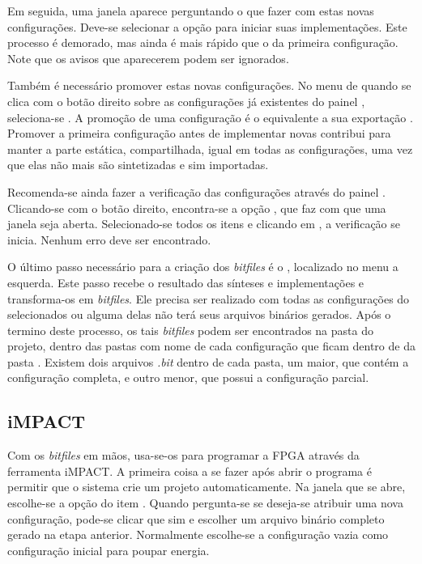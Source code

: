 \documentclass[11pt,a4paper,oneside]{book}
\begin{document}
Em seguida, uma janela aparece perguntando o que fazer com estas novas configurações.
Deve-se selecionar a opção  para iniciar suas implementações.
Este processo é demorado, mas ainda é mais rápido que o da primeira configuração.
Note que os avisos que aparecerem podem ser ignorados.

Também é necessário promover estas novas configurações.
No menu de quando se clica com o botão direito sobre as configurações já existentes do painel , seleciona-se .
A promoção de uma configuração é o equivalente a sua exportação \cite{ug748}.
Promover a primeira configuração antes de implementar novas contribui para manter a parte estática, compartilhada, igual em todas as configurações, uma vez que elas não mais são sintetizadas e sim importadas.

Recomenda-se ainda fazer a verificação das configurações através do painel .
Clicando-se com o botão direito, encontra-se a opção , que faz com que uma janela seja aberta.
Selecionado-se todos os itens e clicando em , a verificação se inicia.
Nenhum erro deve ser encontrado.

O último passo necessário para a criação dos \textit{bitfiles} é o , localizado no menu a esquerda.
Este passo recebe o resultado das sínteses e implementações e transforma-os em \textit{bitfiles}.
Ele precisa ser realizado com todas as configurações do  selecionados ou alguma delas não terá seus arquivos binários gerados.
Após o termino deste processo, os tais \textit{bitfiles} podem ser encontrados na pasta do projeto, dentro das pastas com nome de cada configuração que ficam dentro de da pasta .
Existem dois arquivos \textit{.bit} dentro de cada pasta, um maior, que contém a configuração completa, e outro menor, que possui a configuração parcial.

\subsection{iMPACT}
Com os \textit{bitfiles} em mãos, usa-se-os para programar a FPGA através da ferramenta iMPACT. 
A primeira coisa a se fazer após abrir o programa é permitir que o sistema crie um projeto automaticamente.
Na janela que se abre, escolhe-se a opção  do item .
Quando pergunta-se se deseja-se atribuir uma nova configuração, pode-se clicar que sim e escolher um arquivo binário completo gerado na etapa anterior.
Normalmente escolhe-se a configuração vazia como configuração inicial para poupar energia.
\end{document}

